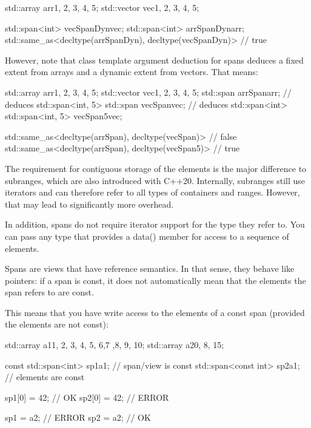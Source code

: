 \begin{cpp}
std::array arr{1, 2, 3, 4, 5};
std::vector vec{1, 2, 3, 4, 5};

std::span<int> vecSpanDyn{vec};
std::span<int> arrSpanDyn{arr};
std::same_as<decltype(arrSpanDyn), decltype(vecSpanDyn)> // true
\end{cpp}

However, note that class template argument deduction for spans deduces a fixed extent from arrays and a dynamic extent from vectors. That means:

\begin{cpp}
std::array arr{1, 2, 3, 4, 5};
std::vector vec{1, 2, 3, 4, 5};
std::span arrSpan{arr}; // deduces std::span<int, 5>
std::span vecSpan{vec}; // deduces std::span<int>
std::span<int, 5> vecSpan5{vec};

std::same_as<decltype(arrSpan), decltype(vecSpan)> // false
std::same_as<decltype(arrSpan), decltype(vecSpan5)> // true
\end{cpp}


The requirement for contiguous storage of the elements is the major difference to subranges, which are also introduced with C++20. Internally, subranges still use iterators and can therefore refer to all types of containers and ranges. However, that may lead to significantly more overhead.

In addition, spans do not require iterator support for the type they refer to. You can pass any type that provides a data() member for access to a sequence of elements.


Spans are views that have reference semantics. In that sense, they behave like pointers: if a span is const, it does not automatically mean that the elements the span refers to are const.

This means that you have write access to the elements of a const span (provided the elements are not const):

\begin{cpp}
std::array a1{1, 2, 3, 4, 5, 6,7 ,8, 9, 10};
std::array a2{0, 8, 15};

const std::span<int> sp1{a1}; // span/view is const
std::span<const int> sp2{a1}; // elements are const

sp1[0] = 42; // OK
sp2[0] = 42; // ERROR

sp1 = a2; // ERROR
sp2 = a2; // OK
\end{cpp}

